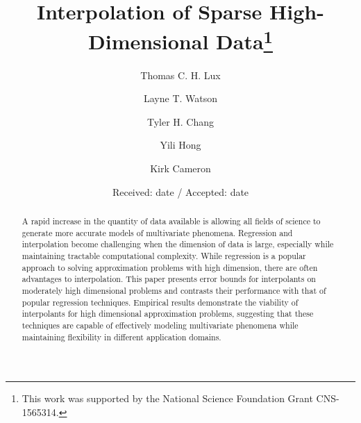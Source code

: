 \documentclass[smallextended,final]{svjour3}       %
\begin{document}
\title{Interpolation of Sparse High-Dimensional Data\thanks
  {This work was supported by the National Science Foundation Grant CNS-1565314.}
}


\author{Thomas C. H. Lux   \and
  Layne T. Watson          \and
  Tyler H. Chang           \and
  Yili Hong                \and
  Kirk Cameron
}



\date{Received: date / Accepted: date}

\maketitle

\begin{abstract}
A rapid increase in the quantity of data available is allowing all
fields of science to generate more accurate models of multivariate
phenomena. Regression and interpolation become challenging when the
dimension of data is large, especially while maintaining tractable
computational complexity. While regression is a popular approach to
solving approximation problems with high dimension, there are often
advantages to interpolation. This paper presents error bounds for
interpolants on moderately high dimensional problems and contrasts
their performance with that of popular regression
techniques. Empirical results demonstrate the viability of
interpolants for high dimensional approximation problems, suggesting
that these techniques are capable of effectively modeling multivariate
phenomena while maintaining flexibility in different application
domains.

\end{abstract}

\end{document}
